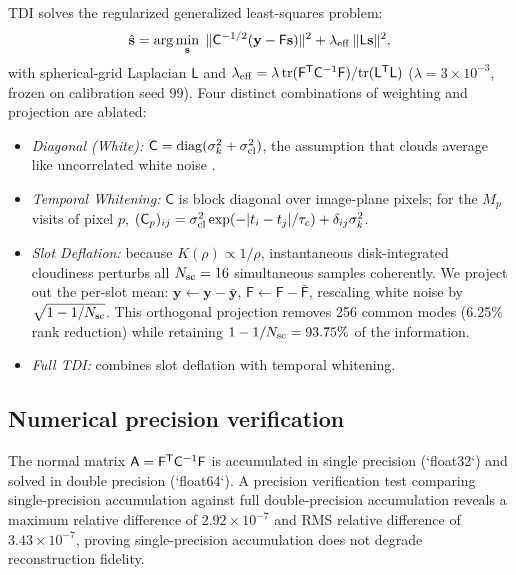 \documentclass[twocolumn]{emulateapj}
\begin{document}
TDI solves the regularized generalized least-squares problem:
\begin{equation}
\hat{\mathbf{s}}=\arg\min_{\mathbf{s}}\;
\|\mathsf{C}^{-1/2}(\mathbf{y}-\mathsf{F}\mathbf{s})\|^2
+\lambda_{\rm eff}\,\|\mathsf{L}\mathbf{s}\|^2,
\label{eq:tdi}
\end{equation}
with spherical-grid Laplacian $\mathsf{L}$ and
$\lambda_{\rm eff}=\lambda\,{\rm tr}(\mathsf{F}^{\sf T}\mathsf{C}^{-1}\mathsf{F})/{\rm tr}(\mathsf{L}^{\sf T}\mathsf{L})$
($\lambda=3\times10^{-3}$, frozen on calibration seed 99).
Four distinct combinations of weighting and projection are ablated:
\begin{itemize}
\item {\it Diagonal (White):} $\mathsf{C}=\mathrm{diag}(\sigma_k^2+\sigma_{\rm cl}^2)$,
the assumption that clouds average like uncorrelated white noise \citep{toth25clouds}.
\item {\it Temporal Whitening:} $\mathsf{C}$ is block diagonal over image-plane
pixels; for the $M_p$ visits of pixel $p$,
$(\mathsf{C}_p)_{ij}=\sigma_{\rm cl}^2\exp(-|t_i-t_j|/\tau_c)+\delta_{ij}\sigma_k^2$.
\item {\it Slot Deflation:} because $K(\rho)\propto1/\rho$, instantaneous
disk-integrated cloudiness perturbs all $N_{\rm sc}=16$ simultaneous samples
coherently. We project out the per-slot mean: $\mathbf{y}\leftarrow\mathbf{y}-\bar{\mathbf{y}}$,
$\mathsf{F}\leftarrow\mathsf{F}-\bar{\mathsf{F}}$, rescaling white noise by
$\sqrt{1-1/N_{\rm sc}}$. This orthogonal projection removes 256 common modes
(6.25\% rank reduction) while retaining $1-1/N_{\rm sc}=93.75\%$ of the information.
\item {\it Full TDI:} combines slot deflation with temporal whitening.
\end{itemize}

\subsection{Numerical precision verification}
The normal matrix $\mathsf{A}=\mathsf{F}^{\sf T}\mathsf{C}^{-1}\mathsf{F}$
is accumulated in single precision (`float32`) and solved in double precision
(`float64`). A precision verification test comparing single-precision
accumulation against full double-precision accumulation reveals a maximum
relative difference of $2.92\times10^{-7}$ and RMS relative difference of
$3.43\times10^{-7}$, proving single-precision accumulation does not degrade
reconstruction fidelity.
\end{document}

